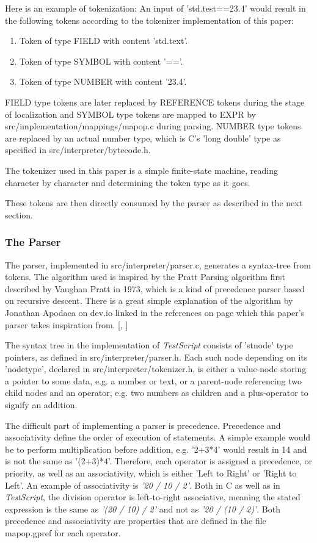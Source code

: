 \documentclass[12pt,a4paper]{article}
\newcommand{\name}{\emph{TestScript}}
\begin{document}
Here is an example of tokenization:
An input of 'std.test==23.4' would result in the following tokens according
to the tokenizer implementation of this paper:
\begin{enumerate}
    \item Token of type FIELD with content 'std.text'.
    \item Token of type SYMBOL with content '=='.
    \item Token of type NUMBER with content '23.4'.
\end{enumerate}
FIELD type tokens are later replaced by REFERENCE tokens during the stage of localization
and SYMBOL type tokens are mapped to EXPR by src/implementation/mappings/mapop.c
during parsing. NUMBER type tokens are replaced by an actual number type, which
is C's 'long double' type as specified in src/interpreter/bytecode.h.

The tokenizer used in this paper is a simple finite-state machine, reading
character by character and determining the token type as it goes.

These tokens are then directly consumed by the parser as described in the next
section.

\subsubsection{The Parser}
The parser, implemented in src/interpreter/parser.c, generates a syntax-tree
from tokens. The algorithm used is inspired by the Pratt Parsing
algorithm first described by Vaughan Pratt in 1973, which is a kind of precedence
parser based on recursive descent. There is a great simple explanation of the algorithm
by Jonathan Apodaca on dev.io linked in the references on page 
\pageref{bibliography} which this paper's parser takes inspiration from.
[, ]

The syntax tree in the implementation of \name{} consists of 'stnode' type
pointers, as defined in src/interpreter/parser.h. Each such node depending
on its 'nodetype', declared in src/interpreter/tokenizer.h,
is either a value-node storing a pointer to some data, e.g. a number or text, or a
parent-node referencing two child nodes and an operator, e.g. two numbers as
children and a plus-operator to signify an addition.

The difficult part of implementing a parser is precedence. Precedence and
associativity define the order of execution of statements. A simple example
would be to perform multiplication before addition, e.g. '2+3*4' would
result in 14 and is not the same as '(2+3)*4'. Therefore, each operator is
assigned a precedence, or priority, as well as an associativity, which is
either 'Left to Right' or 'Right to Left'. An example of associativity is
\emph{'20 / 10 / 2'}. Both in C as well as in \name{}, the division operator is
left-to-right associative, meaning the stated expression is the same as
\emph{'(20 / 10) / 2'} and not as \emph{'20 / (10 / 2)'}. Both precedence 
and associativity are properties that are defined in the file mapop.gpref for
each operator.
\end{document}
